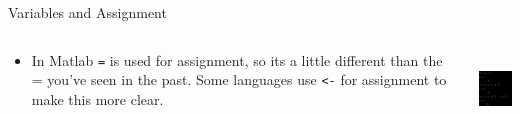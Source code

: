{}\documentclass[letterpaper,
compress,
xcolor=x11names,
]{beamer}
\begin{document}
\begin{frame}{Variables and Assignment}
\begin{itemize}
\begin{columns}
\begin{column}{0.65\linewidth}
\begin{itemize}
					\item In Matlab \texttt{=} is used for assignment, so its a little different than the = you've seen in the past. Some languages use \texttt{<-} for assignment to make this more clear.
				\end{itemize}
			\end{column}
			\begin{column}{0.3\linewidth}
				\begin{center}
					\includegraphics[height = 2cm]{VariableUpdates.png}
				\end{center}
			\end{column}
		\end{columns}
	\end{itemize}
\end{frame}
\end{document}
